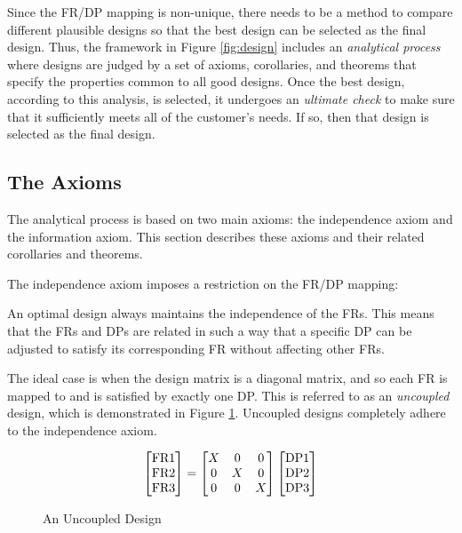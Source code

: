 Since the FR/DP mapping is non-unique, there needs to be a method to compare different plausible designs so that
the best design can be selected as the final design.  Thus, the framework in Figure \ref{fig:design} includes an
\emph{analytical process} where designs are judged by a set of axioms, corollaries, and theorems that specify the
properties common to all good designs.  Once the best design, according to this analysis, is selected, it undergoes
an \emph{ultimate check} to make sure that it sufficiently meets all of the customer's needs.  If so, then that
design is selected as the final design.

\subsection{The Axioms}

The analytical process is based on two main axioms: the independence axiom and the information axiom.  This section
describes these axioms and their related corollaries and theorems.

The independence axiom imposes a restriction on the FR/DP mapping:

\begin{axiom}[Independence]
  \label{axm:independ}
  An optimal design always maintains the independence of the FRs.  This means that the FRs and DPs are related in
  such a way that a specific DP can be adjusted to satisfy its corresponding FR without affecting other FRs.
\end{axiom}

The ideal case is when the design matrix is a diagonal matrix, and so each FR is mapped to and is satisfied by
exactly one DP.  This is referred to as an \emph{uncoupled} design, which is demonstrated in Figure
\ref{fig:uncoupled}.  Uncoupled designs completely adhere to the independence axiom.

\begin{figure}[h]
  \label{fig:uncoupled}
  \begin{equation*}
    \begin{bmatrix}
      \text{FR}1 \\ \text{FR}2 \\ \text{FR}3
    \end{bmatrix}=\begin{bmatrix}
    X & 0 & 0 \\
    0 & X & 0 \\
    0 & 0 & X \\
    \end{bmatrix}\begin{bmatrix}
      \text{DP}1 \\ \text{DP}2 \\ \text{DP}3
    \end{bmatrix}
  \end{equation*}
  \caption{An Uncoupled Design}
\end{figure}

